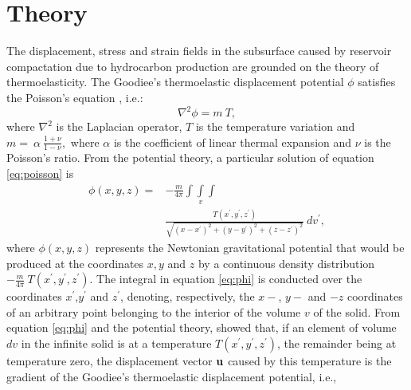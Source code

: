 \documentclass[P]{BrJG_submit}
\begin{document}
\section*{Theory}
The displacement, stress and strain fields in the subsurface caused by reservoir compactation due to hydrocarbon production are grounded on the theory of thermoelasticity. 
The Goodiee’s thermoelastic displacement potential $\phi$ satisfies the Poisson's equation \citep{Goodier37}, i.e.:
\begin{equation}
\nabla^{2} \phi =  m \: T,
\label{eq:poisson}
\end{equation}
where $\nabla^{2}$ is the Laplacian operator, $T $ is the temperature variation and 
$m =  \:  \alpha \: \frac{1 + \nu}{ 1 -\nu},$
where $\alpha$ is the coefficient of linear thermal expansion and $\nu$ is the Poisson's ratio.
From the potential theory, a particular solution of equation \ref{eq:poisson} is
\begin{equation}
\begin{aligned}
\phi(x,y,z) = & -  \frac{m}{4 \pi} \int\int\limits_{v}\int \\ 
   & \frac{T(x^{\prime}, y^{\prime}, z^{\prime} )}   
    {\sqrt{(x - x^{\prime})^{2} + (y - y^{\prime})^{2} + (z - z^{\prime})^{2}}} \: dv^{\prime},
\end{aligned}
\label{eq:phi}
\end{equation}
where $\phi(x,y,z)$ represents the Newtonian gravitational potential \citep{Kellogg29} that would be produced at the coordinates $x, y$ and $z$ by a continuous density distribution $- \frac{m}{4 \pi}  \: T( x^{\prime}, y^{\prime}, z^{\prime} )$. 
The integral in equation \ref{eq:phi} is conducted over the coordinates $x^{\prime}$,$y^{\prime}$ and $z^{\prime}$, denoting, respectively, the $x-$, $y-$ and $-z$ coordinates of an arbitrary point belonging to the interior of the volume $v$ of the solid. 
From equation \ref{eq:phi} and the potential theory, \citet{Goodier37} showed that, if an element of volume $dv$ in the infinite solid is at a temperature $T(x^{\prime}, y^{\prime}, z^{\prime}) $, the remainder being at temperature zero, the displacement vector $\bf{u}$ caused by this temperature is the gradient of the Goodiee’s thermoelastic displacement potential, i.e.,
\end{document}
